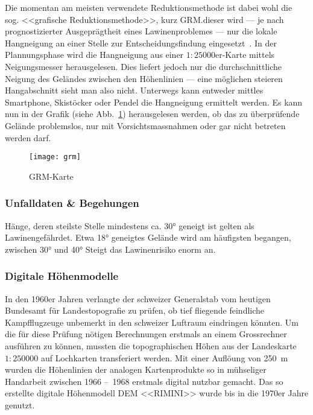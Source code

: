 Die momentan am meisten verwendete Reduktionsmethode ist dabei wohl die sog. <<grafische Reduktionsmethode>>, kurz GRM.\@Bei dieser wird --- je nach prognostizierter Ausgeprägtheit eines Lawinenproblemes --- nur die lokale Hangneigung an einer Stelle zur Entscheidungsfindung eingesetzt~\cite{sacbergspwinter}. In der Plannungsphase wird die Hangneigung aus einer $1:25000$er-Karte mittels Neigungsmesser herausgelesen. Dies liefert jedoch nur die durchschnittliche Neigung des Geländes zwischen den Höhenlinien --- eine möglichen steieren Hangabschnitt sieht man also nicht.
Unterwegs kann entweder mittles Smartphone, Skistöcker oder Pendel die Hangneigung ermittelt werden. Es kann nun in der Grafik (siehe Abb.\ \ref{fig:grm}) herausgelesen werden, ob das zu überprüfende Gelände problemslos, nur mit Vorsichtsmassnahmen oder gar nicht betreten werden darf.

\begin{figure}[H]
  \centering
  \texttt{[image: grm]}
  \caption{GRM-Karte~\cite{achtunglawine}}\label{fig:grm}
\end{figure}



\subsubsection{Unfalldaten \& Begehungen}

Hänge, deren steilste Stelle mindestens ca. 30° geneigt ist gelten als Lawinengefährdet. Etwa 18° geneigtes Gelände wird am häufigsten begangen, zwischen 30° und 40° Steigt das Lawinenrisiko enorm an.~\cite{sacbergspwinterp99} 






\subsubsection{Digitale Höhenmodelle}

In den 1960er Jahren verlangte der schweizer Generalstab vom heutigen Bundesamt für Landestopografie zu prüfen, ob tief fliegende feindliche Kampfflugzeuge unbemerkt in den schweizer Luftraum eindringen könnten. Um die für diese Prüfung nötigen Berechnungen erstmals an einem Grossrechner ausführen zu können, mussten die topographischen Höhen aus der Landeskarte $1:250000$ auf Lochkarten transferiert werden. Mit einer Auflöung von \qty{250}{m} wurden die Höhenlinien der analogen Kartenprodukte so in mühseliger Handarbeit zwischen 1966 --~1968 erstmals digital nutzbar gemacht. Das so erstellte digitale Höhenmodell DEM <<RIMINI>> wurde bis in die 1970er Jahre genutzt.~\cite{swisstopohistdem}

